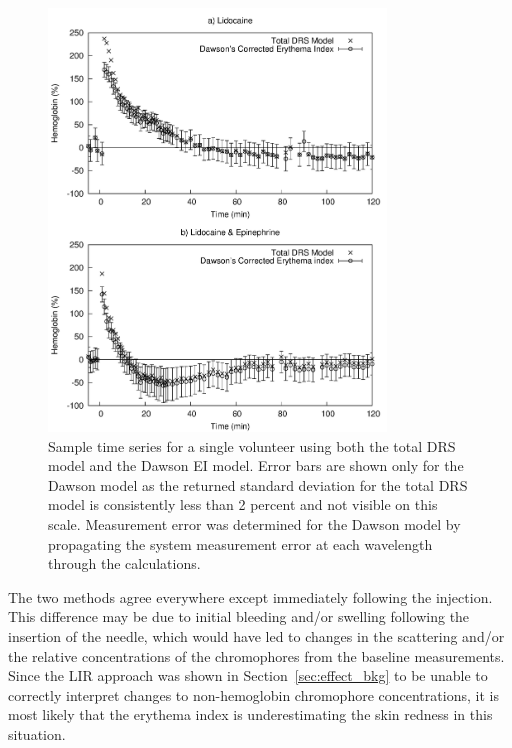 \begin{figure}
	\centering \includegraphics[width=0.8\textwidth]{figures/p3-lido_epi.png}
	\caption[Hover and figure index text]{\label{fig:p3-lido_epi}Sample time series for a single volunteer using both the total DRS model and the Dawson EI model. Error bars are shown only for the Dawson model as the returned standard deviation for the total DRS model is consistently less than 2 percent and not visible on this scale. Measurement error was determined for the Dawson model by propagating the system measurement error at each wavelength through the calculations.}
\end{figure}

The two methods agree everywhere except immediately following the injection. This difference may be due to initial bleeding and/or swelling following the insertion of the needle, which would have led to changes in the scattering and/or the relative concentrations of the chromophores from the baseline measurements. Since the LIR approach was shown in Section~\ref{sec:effect_bkg} to be unable to correctly interpret changes to non-hemoglobin chromophore concentrations, it is most likely that the erythema index is underestimating the skin redness in this situation.

